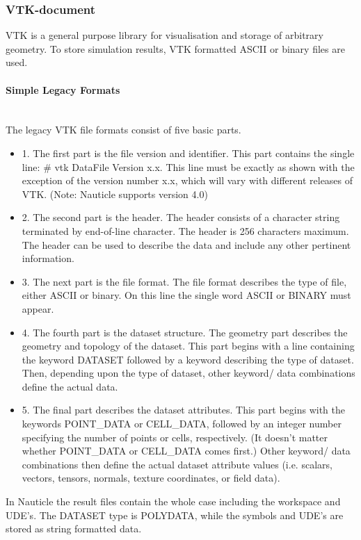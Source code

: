\documentclass[a4paper,12pt,openany]{book}
\newcommand{\myparagraph}[1]{\paragraph{#1}\mbox{}\\}
\theoremstyle{break}
\begin{document}
\subsubsection{VTK-document}
VTK is a general purpose library for visualisation and storage of arbitrary geometry. To store simulation results, VTK formatted ASCII or binary files are used.
\myparagraph{Simple Legacy Formats}
The legacy VTK file formats consist of five basic parts.
\begin{itemize}
\item 1. The first part is the file version and identifier. This part contains the single line: \# vtk DataFile Version x.x. This line must be exactly as shown with the exception of the version number x.x, which will vary with different releases of VTK. (Note: Nauticle supports version 4.0) 
\item 2. The second part is the header. The header consists of a character string terminated by end-of-line character. The header is 256 characters maximum. The header can be used to describe the data and include any other pertinent information. 
\item 3. The next part is the file format. The file format describes the type of file, either ASCII or binary. On this line the single word ASCII or BINARY must appear. 
\item 4. The fourth part is the dataset structure. The geometry part describes the geometry and topology of the dataset. This part begins with a line containing the keyword DATASET followed by a keyword describing the type of dataset. Then, depending upon the type of dataset, other keyword/ data combinations define the actual data.
\item 5. The final part describes the dataset attributes. This part begins with the keywords POINT\_DATA or CELL\_DATA, followed by an integer number specifying the number of points or cells, respectively. (It doesn't matter whether POINT\_DATA or CELL\_DATA comes first.) Other keyword/ data combinations then define the actual dataset attribute values (i.e. scalars, vectors, tensors, normals, texture coordinates, or field data). 
\end{itemize}
In Nauticle the result files contain the whole case including the workspace and UDE's. The DATASET type is POLYDATA, while the symbols and UDE's are stored as string formatted data.
\end{document}
